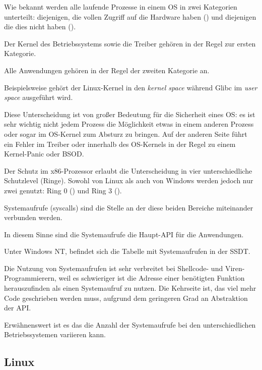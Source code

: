 
\label{syscalls}

Wie bekannt werden alle laufende Prozesse in einem \ac{OS} in zwei Kategorien unterteilt:
diejenigen, die vollen Zugriff auf die Hardware haben () und diejenigen
die dies nicht haben ().

Der Kernel des Betriebssystems sowie die Treiber gehören in der Regel zur ersten Kategorie.

Alle Anwendungen gehören in der Regel der zweiten Kategorie an.

Beispielsweise gehört der Linux-Kernel in den \emph{kernel space} während Glibc im \emph{user space}
ausgeführt wird.

Diese Unterscheidung ist von großer Bedeutung für die Sicherheit eines \ac{OS}:
es ist sehr wichtig nicht jedem Prozess die Möglichkeit etwas in einem anderen Prozess oder
sogar im \ac{OS}-Kernel zum Absturz zu bringen.
Auf der anderen Seite führt ein Fehler im Treiber oder innerhalb des \ac{OS}-Kernels in der Regel
zu einem Kernel-Panic oder \ac{BSOD}.

Der Schutz im x86-Prozessor erlaubt die Unterscheidung in vier unterschiedliche Schutzlevel (Ringe).
Sowohl von Linux als auch von Windows werden jedoch nur zwei genutzt:
Ring 0 () und Ring 3 ().

Systemaufrufe (syscalls) sind die Stelle an der diese beiden Bereiche miteinander verbunden werden.

In diesem Sinne sind die Systemaufrufe die Haupt-\ac{API} für die Anwendungen.

Unter \gls{Windows NT}, befindet sich die Tabelle mit Systemaufrufen in der \ac{SSDT}.


Die Nutzung von Systemaufrufen ist sehr verbreitet bei Shellcode- und Viren-Programmierern,
weil es schwieriger ist die Adresse einer benötigten Funktion herauszufinden als einen
Systemaufruf zu nutzen.
Die Kehrseite ist, das viel mehr Code geschrieben werden muss, aufgrund dem geringeren Grad
an Abstraktion der \ac{API}.

Erwähnenswert ist es das die Anzahl der Systemaufrufe bei den unterschiedlichen Betriebssystemen
variieren kann.

\subsection{Linux}
\label{linux_syscall}

